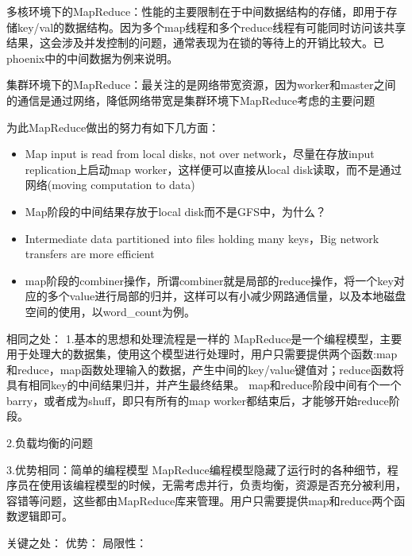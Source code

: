 多核环境下的MapReduce：性能的主要限制在于中间数据结构的存储，即用于存储key/val的数据结构。因为多个map线程和多个reduce线程有可能同时访问该共享结果，这会涉及并发控制的问题，通常表现为在锁的等待上的开销比较大。已phoenix中的中间数据为例来说明。

集群环境下的MapReduce：最关注的是网络带宽资源，因为worker和master之间的通信是通过网络，降低网络带宽是集群环境下MapReduce考虑的主要问题

为此MapReduce做出的努力有如下几方面：
\begin{itemize}
  \item Map input is read from local disks, not over network，尽量在存放input replication上启动map worker，这样便可以直接从local disk读取，而不是通过网络(moving computation to data)
  \item Map阶段的中间结果存放于local disk而不是GFS中，为什么？
  \item Intermediate data partitioned into files holding many keys，Big network transfers are more efficient
  \item map阶段的combiner操作，所谓combiner就是局部的reduce操作，将一个key对应的多个value进行局部的归并，这样可以有小减少网路通信量，以及本地磁盘空间的使用，以word\_count为例。
\end{itemize}

相同之处：
1.基本的思想和处理流程是一样的
MapReduce是一个编程模型，主要用于处理大的数据集，使用这个模型进行处理时，用户只需要提供两个函数:map和reduce，map函数处理输入的数据，产生中间的key/value键值对；reduce函数将具有相同key的中间结果归并，并产生最终结果。
map和reduce阶段中间有个一个barry，或者成为shuff，即只有所有的map worker都结束后，才能够开始reduce阶段。

2.负载均衡的问题

3.优势相同：简单的编程模型
MapReduce编程模型隐藏了运行时的各种细节，程序员在使用该编程模型的时候，无需考虑并行，负责均衡，资源是否充分被利用，容错等问题，这些都由MapReduce库来管理。用户只需要提供map和reduce两个函数逻辑即可。

关键之处：
优势：
局限性：
